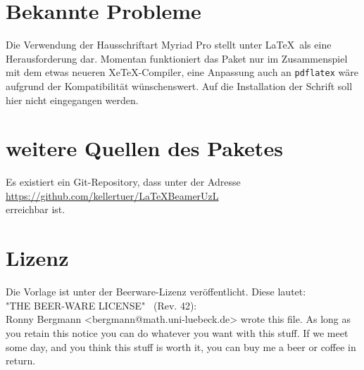\documentclass[a4paper,DIV=calc, oneside]{scrartcl}
\begin{document}
\section{Bekannte Probleme}
Die Verwendung der Hausschriftart Myriad Pro stellt unter \LaTeX\ als eine Herausforderung dar. Momentan funktioniert das Paket nur im Zusammenspiel mit dem etwas neueren XeTeX-Compiler, eine Anpassung auch an \lstinline!pdflatex! wäre aufgrund der Kompatibilität wünschenswert. Auf die Installation der Schrift soll hier nicht eingegangen werden.
\section{weitere Quellen des Paketes}\label{sec:HP}
Es existiert ein Git-Repository, dass unter der Adresse\\ \href{https://github.com/kellertuer/LaTeXBeamerUzL}{https://github.com/kellertuer/LaTeXBeamerUzL}\\
erreichbar ist.
\section{Lizenz}
Die Vorlage ist unter der Beerware-Lizenz veröffentlicht. Diese lautet:\\[1\baselineskip]
\textrm{"THE BEER-WARE LICENSE" \ (Rev. 42):\\
Ronny Bergmann <bergmann@math.uni-luebeck.de> wrote this file. As long as you retain this notice you
can do whatever you want with this stuff. If we meet some day, and you think 
this stuff is worth it, you can buy me a beer or coffee in return.}
\end{document}
